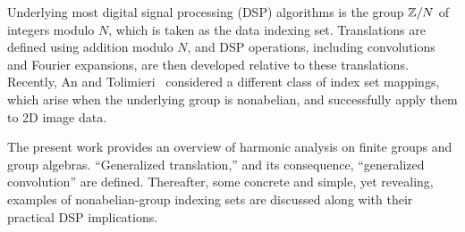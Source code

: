 Underlying most digital signal processing (DSP) algorithms
is the group $\mathbb{Z}/N$ of integers modulo $N$, which is
taken as the data indexing set. Translations are defined
using addition modulo $N$, and DSP operations, including
convolutions and Fourier expansions, are then developed
relative to these translations. Recently, An and
Tolimieri~\cite{An:2003} considered a different class of
index set mappings, which arise when the underlying group is
nonabelian, and successfully apply them to 2D image data. 

The present work provides an overview of harmonic analysis on finite
groups and group algebras. 
``Generalized translation,'' and its consequence, ``generalized
convolution'' are defined.  Thereafter, some concrete and simple, yet revealing,
examples of nonabelian-group indexing sets  
are discussed along with their practical DSP implications.
